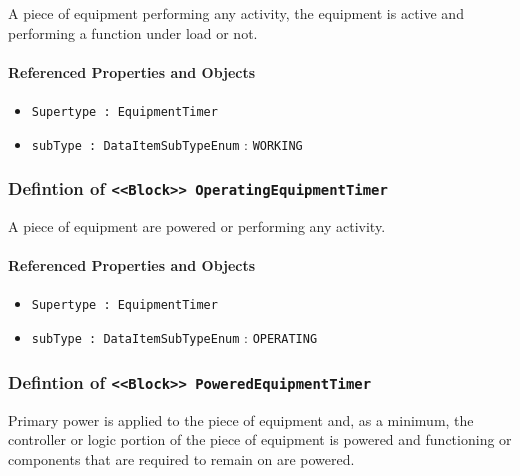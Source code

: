 \FloatBarrier

A piece of equipment performing any activity, the equipment is active and performing a function under load or not.

\FloatBarrier
\paragraph{Referenced Properties and Objects}

\begin{itemize}
\item \texttt{Supertype : EquipmentTimer}

\item \texttt{subType : DataItemSubTypeEnum} : \texttt{WORKING}

\end{itemize}
\FloatBarrier
\subsubsection{Defintion of \texttt{<<Block>> OperatingEquipmentTimer}}
  \label{type:OperatingEquipmentTimer}

\FloatBarrier

A piece of equipment are powered or performing any activity.

\FloatBarrier
\paragraph{Referenced Properties and Objects}

\begin{itemize}
\item \texttt{Supertype : EquipmentTimer}

\item \texttt{subType : DataItemSubTypeEnum} : \texttt{OPERATING}

\end{itemize}
\FloatBarrier
\subsubsection{Defintion of \texttt{<<Block>> PoweredEquipmentTimer}}
  \label{type:PoweredEquipmentTimer}

\FloatBarrier

Primary  power is  applied  to the  piece  of  equipment and,  as  a minimum, the controller or logic portion of the piece of equipment is powered and functioning or components that are required to remain on are powered.

